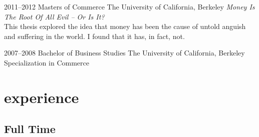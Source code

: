 \documentclass[a4paper]{cv-friggeri-k}
\begin{document}
\begin{entrylist}


\entry
{2011--2012}
{Masters {\normalfont of Commerce}}
{The University of California, Berkeley}
{\emph{Money Is The Root Of All Evil -- Or Is It?} \\ This thesis explored the idea that money has been the cause of untold anguish and suffering in the world. I found that it has, in fact, not.}


\entry
{2007--2008}
{Bachelor {\normalfont of Business Studies}}
{The University of California, Berkeley}
{Specialization in Commerce}


\end{entrylist}


\section{experience}

\subsection{Full Time}
\end{document}
